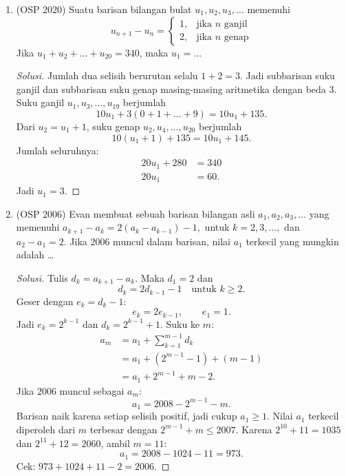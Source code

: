 \documentclass[12pt]{scrartcl}
\begin{document}
\begin{enumerate}[resume]

	\item (OSP 2020)
	Suatu barisan bilangan bulat $u_1, u_2, u_3, \dots$ memenuhi
	\[
	u_{n+1}-u_n =
	\begin{cases}
	1, & \text{jika } n \text{ ganjil} \\
	2, & \text{jika } n \text{ genap}
	\end{cases}
	\]
	Jika $u_1+u_2+\dots+u_{20}=340$, maka $u_1=\dots$
	\begin{proof}[Solusi]
	\renewcommand{\qedsymbol}{$\blacksquare$}
	Jumlah dua selisih berurutan selalu $1 + 2 = 3$. Jadi subbarisan suku
	ganjil dan subbarisan suku genap masing-masing aritmetika dengan beda $3$.
	Suku ganjil $u_1, u_3, \dots, u_{19}$ berjumlah
	\[ 10u_1 + 3(0 + 1 + \dots + 9) = 10u_1 + 135. \]
	Dari $u_2 = u_1 + 1$, suku genap $u_2, u_4, \dots, u_{20}$ berjumlah
	\[ 10(u_1 + 1) + 135 = 10u_1 + 145. \]
	Jumlah seluruhnya:
	\begin{align*}
	20u_1 + 280 &= 340 \\
	20u_1 &= 60.
	\end{align*}
	Jadi $u_1 = 3$.
	\end{proof}

	\item (OSP 2006)
	Evan membuat sebuah barisan bilangan asli $a_{1}, a_{2}, a_{3},\dots$ yang memenuhi $a_{k+1}-a_{k}=2(a_{k}-a_{k-1})-1,$ untuk $k=2,3,\dots,$ dan $a_{2}-a_{1}=2$. Jika 2006 muncul dalam barisan, nilai $a_{1}$ terkecil yang mungkin adalah \dots
	\begin{proof}[Solusi]
	\renewcommand{\qedsymbol}{$\blacksquare$}
	Tulis $d_k = a_{k+1} - a_k$. Maka $d_1 = 2$ dan
	\[ d_k = 2d_{k-1} - 1 \quad \text{untuk } k \ge 2. \]
	Geser dengan $e_k = d_k - 1$:
	\[ e_k = 2e_{k-1}, \qquad e_1 = 1. \]
	Jadi $e_k = 2^{k-1}$ dan $d_k = 2^{k-1} + 1$. Suku ke $m$:
	\begin{align*}
	a_m &= a_1 + \sum_{k=1}^{m-1} d_k \\
	&= a_1 + (2^{m-1} - 1) + (m - 1) \\
	&= a_1 + 2^{m-1} + m - 2.
	\end{align*}
	Jika $2006$ muncul sebagai $a_m$:
	\[ a_1 = 2008 - 2^{m-1} - m. \]
	Barisan naik karena setiap selisih positif, jadi cukup $a_1 \ge 1$.
	Nilai $a_1$ terkecil diperoleh dari $m$ terbesar dengan
	$2^{m-1} + m \le 2007$. Karena $2^{10} + 11 = 1035$ dan
	$2^{11} + 12 = 2060$, ambil $m = 11$:
	\[ a_1 = 2008 - 1024 - 11 = 973. \]
	Cek: $973 + 1024 + 11 - 2 = 2006$.
	\end{proof}


\end{enumerate}
\end{document}

